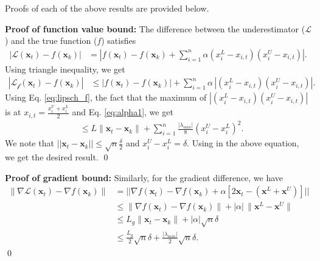 \documentclass{elsarticle}
\numberwithin{equation}{section}
\begin{document}
Proofs of each of the above results are provided below.

\noindent \textbf{Proof of function value bound:}
The difference between the underestimator ($\mathcal{L}$) and the true function ($f$) satisfies
\begin{align*}
    \left| \mathcal{L}(\mathbf{x}_t) - f(\mathbf{x}_k) \right| 
    &= \left| f(\mathbf{x}_t) - f(\mathbf{x}_k) + \sum_{i=1}^n \alpha (x_i^L - x_{i,t})(x_i^U - x_{i,t}) \right|.
    \end{align*}
Using triangle inequality, we get 
    \begin{align*}
       \left| \mathcal{L_f}(\mathbf{x}_t) - f(\mathbf{x}_k) \right| 
       &\leq \left| f(\mathbf{x}_t) - f(\mathbf{x}_k) \right| + \sum_{i=1}^n \alpha \, |(x_i^L - x_{i,t}) (x_i^U - x_{i,t})|.
       \end{align*}
Using Eq. \ref{eq:lipsch_f}, the fact that the maximum of $|(x_i^L-x_{i,t})(x_i^U-x_{i,t})|$ is at $x_{i,t}=\frac{x_i^U+x_i^L}{2}$ and Eq. \ref{eq:alpha1}, we get 
\begin{align*}
    &\leq L \|\mathbf{x}_t - \mathbf{x}_k\| + \sum_{i=1}^n \frac{|\lambda_{min}|}{8} (x_i^U-x_i^L)^2 .
\end{align*}
We note that $||\mathbf{x}_t-\mathbf{x}_k|| \leq \sqrt{n}\frac{\delta}{2}$ and $x_i^U-x_i^L=\delta$. Using in the above equation, we get the desired result.
\qed

\vspace{1em}

\noindent \textbf{Proof of gradient bound:}
Similarly, for the gradient difference, we have
\begin{align*}
    \left\| \nabla \mathcal{L}(\mathbf{x}_t) - \nabla f(\mathbf{x}_k) \right\| 
    &= || \nabla f(\mathbf{x}_t) - \nabla f(\mathbf{x}_k) + \alpha [2\mathbf{x}_{t}-(\mathbf{x}^L+\mathbf{x}^U)]|| \\
    &\leq \left\| \nabla f(\mathbf{x}_t) - \nabla f(\mathbf{x}_k) \right\| +  |\alpha| \, \|\mathbf{x}^L - \mathbf{x}^U\| \\
    &\leq L_g \|\mathbf{x}_t - \mathbf{x}_k\| + |\alpha| \sqrt{n} \delta \\
    &\leq \frac{L_g}{2} \sqrt{n} \delta + \frac{|\lambda_{min}|}{2} \sqrt{n}\delta.
\end{align*}
\qed
\end{document}
